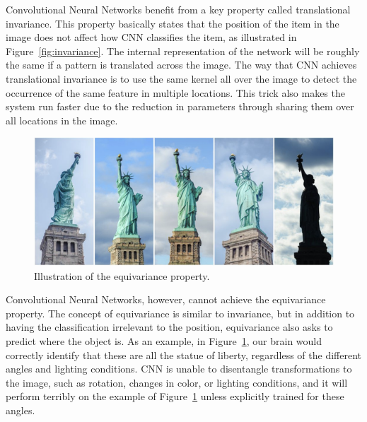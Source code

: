 \documentclass{article}
\begin{document}

Convolutional Neural Networks benefit from a key property called translational invariance. This property basically states that the position of the item in the image does not affect how CNN classifies the item, as illustrated in Figure~\ref{fig:invariance}. The internal representation of the network will be roughly the same if a pattern is translated across the image. The way that CNN achieves translational invariance is to use the same kernel all over the image to detect the occurrence of the same feature in multiple locations. This trick also makes the system run faster due to the reduction in parameters through sharing them over all locations in the image.

\begin{figure}[!htb]
	\centering\includegraphics[width=\textwidth]{fig//equivariance}
	\caption{Illustration of the equivariance property.\protect\footnotemark }\label{fig:equivariance}
\end{figure}


Convolutional Neural Networks, however, cannot achieve the equivariance property. The concept of equivariance is similar to invariance, but in addition to having the classification irrelevant to the position, equivariance also asks to predict where the object is. As an example, in Figure~\ref{fig:equivariance}, our brain would correctly identify that these are all the statue of liberty, regardless of the different angles and lighting conditions. CNN is unable to disentangle transformations to the image, such as rotation, changes in color, or lighting conditions, and it will perform terribly on the example of Figure~\ref{fig:equivariance} unless explicitly trained for these angles.
\end{document}
